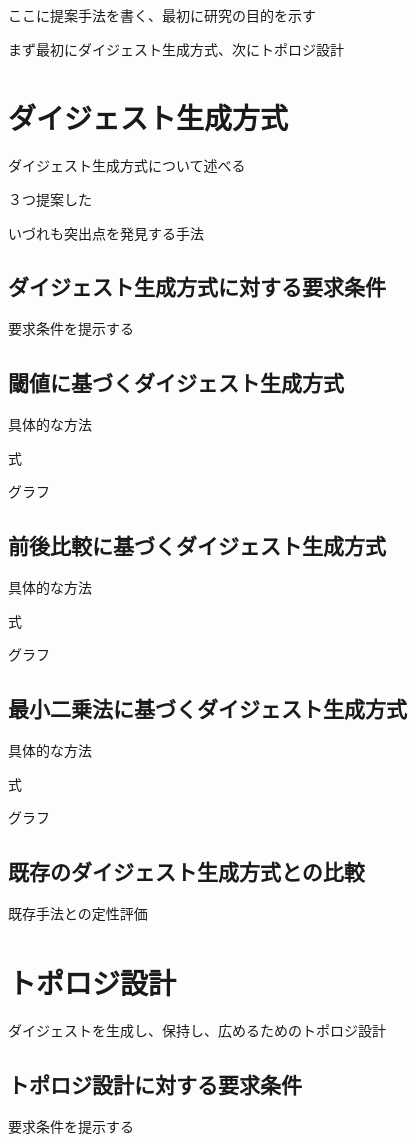 ここに提案手法を書く、最初に研究の目的を示す


まず最初にダイジェスト生成方式、次にトポロジ設計
\section{ダイジェスト生成方式}
ダイジェスト生成方式について述べる

３つ提案した

いづれも突出点を発見する手法

\subsection{ダイジェスト生成方式に対する要求条件}
要求条件を提示する

\subsection{閾値に基づくダイジェスト生成方式}
具体的な方法

式

グラフ

\subsection{前後比較に基づくダイジェスト生成方式}
具体的な方法

式

グラフ


\subsection{最小二乗法に基づくダイジェスト生成方式}
具体的な方法

式

グラフ

\subsection{既存のダイジェスト生成方式との比較}

既存手法との定性評価

\section{トポロジ設計}
ダイジェストを生成し、保持し、広めるためのトポロジ設計

\subsection{トポロジ設計に対する要求条件}
要求条件を提示する

